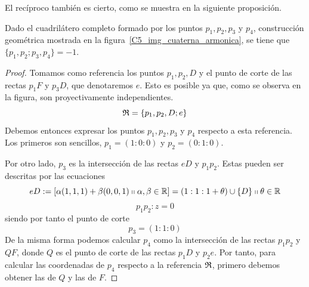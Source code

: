 El recíproco también es cierto, como se muestra en la siguiente proposición.
\begin{prop}
	Dado el cuadrilátero completo formado por los puntos $p_1,p_2,p_3$ y $p_4$, construcción geométrica mostrada en la figura~\ref{C5_img_cuaterna_armonica}, se tiene que $\{p_1,p_2;p_3,p_4\}=-1$.
	
\end{prop}
\begin{proof}
	Tomamos como referencia los puntos $p_1,p_2,D$ y el punto de corte de las rectas $p_1F$ y $p_3D$, que denotaremos $e$. Esto es posible ya que, como se observa en la figura, son proyectivamente independientes.
	\[\mathfrak{R}=\{p_1,p_2,D;e\}\]
	Debemos entonces expresar los puntos $p_1,p_2,p_3$ y $p_4$ respecto a esta referencia. Los primeros son sencillos, $p_1=(1:0:0)$ y $p_2=(0:1:0)$. 
	
	Por otro lado, $p_3$ es la intersección de las rectas $eD$ y $p_1p_2$. Estas pueden ser descritas por las ecuaciones
	\begin{equation*}
		eD:=\left [ \alpha(1,1,1)+\beta(0,0,1)\shortparallel \alpha,\beta\in \mathbb{R} \right ]=(1:1:1+\theta)\cup\{D\}\shortparallel\theta\in\mathbb{R}
	\end{equation*}
	\begin{equation*}
		p_1p_2:z=0
	\end{equation*}
	siendo por tanto el punto de corte 
	\[p_3=(1:1:0)\]
	De la misma forma podemos calcular $p_4$ como la intersección de las rectas $p_1p_2$ y $QF$, donde $Q$ es el punto de corte de las rectas $p_1D$ y $p_2e$. Por tanto, para calcular las coordenadas de $p_4$ respecto a la referencia $\mathfrak{R}$, primero debemos obtener las de $Q$ y las de $F$.
	

\end{proof}
